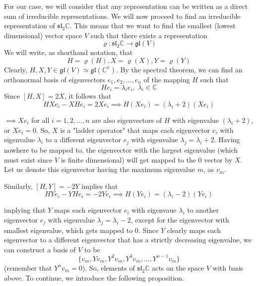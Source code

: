   For our case, we will consider that any representation can be written as a direct sum of irreducible representations. We will now proceed to find an irreducible representation of $\mathfrak{sl}_2 \mathbb{C}$. This means that we want to find the smallest (lowest dimensional) vector space $V$ such that there exists a representation
  \begin{equation}
    \varrho: \mathfrak{sl}_2 \mathbb{C} \longrightarrow \mathfrak{gl}(V)
  \end{equation}
  We will write, as shorthand notation, that 
  \begin{equation}
    H = \varrho(H), X = \varrho(X), Y = \varrho(Y)
  \end{equation}
  Clearly, $H, X, Y \in \mathfrak{gl}(V) \simeq \mathfrak{gl}(\mathbb{C}^n)$. By the spectral theorem, we can find an orthonormal basis of eigenvectors $e_1, e_2, ..., e_n$ of the mapping $H$ such that
  \begin{equation}
    H e_i = \lambda_i e_i, \; \lambda_i \in \mathbb{C}
  \end{equation}
  Since $[H,X] = 2X$, it follows that
  \begin{equation}
    HX e_i - X H e_i = 2X e_i \implies H (X e_i) = (\lambda_i + 2) (X e_i)
  \end{equation}

  $\implies Xe_i$ for all $i = 1, 2, ..., n$ are also eigenvectors of $H$ with eigenvalue $(\lambda_i + 2)$, or $X e_i = 0$. So, $X$ is a "ladder operator" that maps each eigenvector $e_i$ with eigenvalue $\lambda_i$ to a different eigenvector $e_j$ with eigenvalue $\lambda_j = \lambda_i + 2$. Having nowhere to be mapped to, the eigenvector with the largest eigenvalue (which must exist since $V$ is finite dimensional) will get mapped to the $0$ vector by $X$. Let us denote this eigenvector having the maximum eigenvalue $m$, as $v_m$. 

  Similarly, $[H,Y] = -2Y$ implies that
  \begin{equation}
    HY e_i - YH e_i = -2Y e_i \implies H(Y e_i) = (\lambda_i - 2)(Y e_i)
  \end{equation}

  implying that $Y$ maps each eigenvector $e_i$ with eigenvaue $\lambda_i$ to another eigenvector $e_j$ with eigenvalue $\lambda_j = \lambda_i - 2$, except for the eigenvector with smallest eigenvalue, which gets mapped to $0$. Since $Y$ clearly maps each eigenvector to a different eigenvector that has a strictly decreasing eigenvalue, we can construct a basis of $V$ to be
  \begin{equation}
    \{v_m, Y v_m, Y^2 v_m, Y^3 v_m, ..., Y^{n-1} v_m\}
  \end{equation}
  (remember that $Y^n v_m = 0$). So, elements of $\mathfrak{sl}_2 \mathbb{C}$ acts on the space $V$ with basis above. To continue, we introduce the following proposition. 

